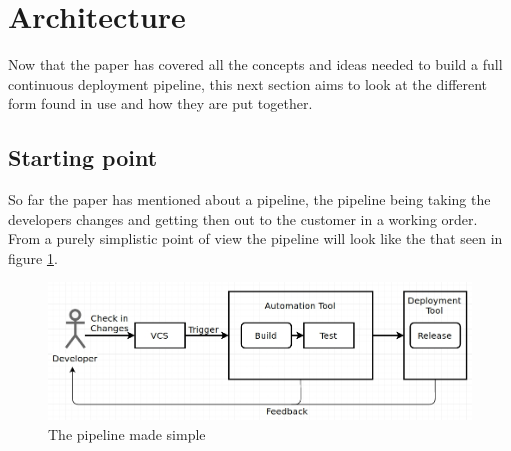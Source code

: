 %
%
%
%
%
%

\section{Architecture}

Now that the paper has covered all the concepts and ideas needed to build a full continuous deployment pipeline, this next section aims to look at the different form found in use and how they are put together.

\subsection{Starting point}

So far the paper has mentioned about a pipeline, the pipeline being taking the developers changes and getting then out to the customer in a working order. From a purely simplistic point of view the pipeline will look like the that seen in figure \ref{fig:pipeline-simple}.

\begin{figure}[H]
	\centering
	\includegraphics[scale=0.45]{images/pipeline-simple.jpg}
	\caption{The pipeline made simple}
	\label{fig:pipeline-simple}
\end{figure}

